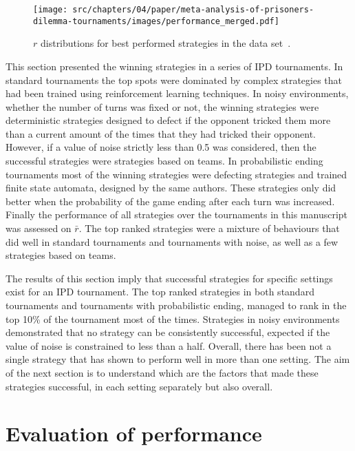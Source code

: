 \begin{figure}[!htbp]
    \centering
    \texttt{[image: src/chapters/04/paper/meta-analysis-of-prisoners-dilemma-tournaments/images/performance\_merged.pdf]}
    \caption{\(r\) distributions for best performed strategies in the data set~\cite{Glynatsi_2019_metatournament}.}
    \label{fig:overall_results}
\end{figure}

This section presented the winning strategies in a series of IPD tournaments. In
standard tournaments the top spots were dominated by complex strategies that had
been trained using reinforcement learning techniques. In noisy environments,
whether the number of turns was fixed or not, the winning strategies were
deterministic strategies designed to defect if the opponent tricked them more
than a current amount of the times that they had tricked their opponent. However,
if a value of noise strictly less than 0.5 was considered, then the successful
strategies were strategies based on teams. In
probabilistic ending tournaments most of the winning strategies were defecting
strategies and trained finite state automata, designed by the same authors.
These strategies only did better when the probability of the game ending after
each turn was increased.
Finally the performance of all \numberofstrategies
strategies over the \numberofalltournaments tournaments in this manuscript was
assessed on \(\bar{r}\). The top ranked strategies were a mixture of behaviours
that did well in standard tournaments and tournaments with noise, as well as a
few strategies based on teams.

The results of this section imply that successful strategies for specific
settings exist for an IPD tournament. The top ranked strategies in both standard
tournaments and tournaments with probabilistic ending, managed to rank in the
top 10\% of the tournament most of the times.
Strategies in noisy
environments demonstrated that no strategy can be consistently
successful, expected if the value of noise is constrained to less than a half.
Overall, there has been not a single strategy that has shown to perform well in
more than one setting. The aim of the next section is to understand which are
the factors that made these strategies successful, in each setting separately
but also overall.

\section{Evaluation of performance}\label{section:evaluation_of_performance}

